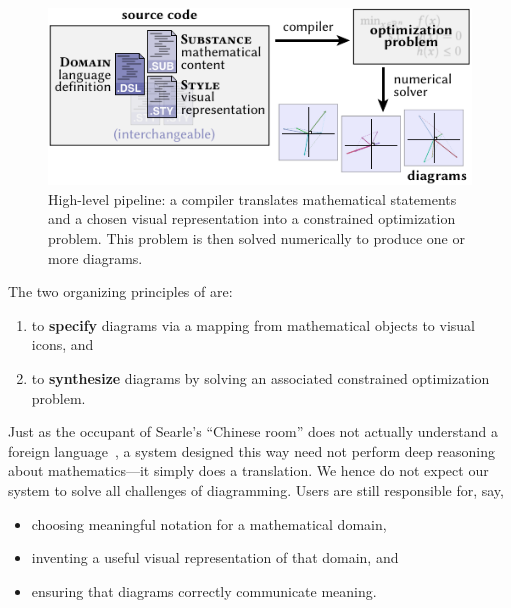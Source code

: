 \begin{figure}[t]
   \centering
   \begin{minipage}[c]{.35\linewidth}
       \caption{High-level pipeline: a compiler translates mathematical statements and a chosen visual representation into a constrained optimization problem.  This problem is then solved numerically to produce one or more diagrams.\label{fig:HighLevelPipeline}}
   \end{minipage}\hfill
   \begin{minipage}[c]{.60\linewidth}
       \includegraphics[width=\linewidth]{assets/penrose/HighLevelPipeline.pdf}
   \end{minipage}\hfill
   \vspace{-\baselineskip}
\end{figure}


\vspace{.5\baselineskip}\begin{mdframed}
The two organizing principles of \Penrose{} are:
   \begin{enumerate}[label=(\roman*)]
      \item to \textbf{specify} diagrams via a mapping from mathematical objects to visual icons, and
      \item to \textbf{synthesize} diagrams by solving an associated constrained optimization problem.
   \end{enumerate}
\end{mdframed}\vspace{.5\baselineskip}


Just as the occupant of Searle's ``Chinese room'' does not actually understand a foreign language~\cite{Cole:2014:CRA}, a system designed this way need not perform deep reasoning about mathematics---it simply does a translation.  We hence do not expect our system to solve all challenges of diagramming. Users are still responsible for, say,
\begin{itemize}
   \item choosing meaningful notation for a mathematical domain,
   \item inventing a useful visual representation of that domain, and
   \item ensuring that diagrams correctly communicate meaning.
\end{itemize}

